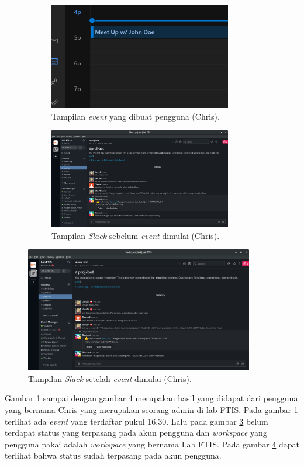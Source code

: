 \begin{figure}[h]
\begin{subfigure}{8.5cm}
  \centering
  \includegraphics[width=8cm]{./Gambar/PengujianChris/Outlook.png}
  \caption{Tampilan \textit{event} yang dibuat pengguna (Chris).}
  \label{fig:outlook_chris}
\end{subfigure}
\begin{subfigure}{8.5cm}
  \centering
  \includegraphics[width=8cm]{./Gambar/PengujianChris/Slack_Before.png}
  \caption{Tampilan \textit{Slack} sebelum \textit{event} dimulai (Chris).}
  \label{fig:slack_before_chris}
\end{subfigure}
\caption{}
\end{figure}

\begin{figure}[h]
  \includegraphics[width=10cm]{./Gambar/PengujianChris/Slack_After.png}
  \centering
  \caption{Tampilan \textit{Slack} setelah \textit{event} dimulai (Chris).}
  \label{fig:slack_after_chris}
\end{figure}

Gambar \ref{fig:outlook_chris} sampai dengan gambar \ref{fig:slack_after_chris} merupakan hasil yang didapat dari pengguna yang bernama Chris yang merupakan seorang admin di lab FTIS. Pada gambar \ref{fig:outlook_chris} terlihat ada \textit{event} yang terdaftar pukul 16.30. Lalu pada gambar \ref{fig:slack_before_chris} belum terdapat status yang terpasang pada akun pengguna dan \textit{workspace} yang pengguna pakai adalah \textit{workspace} yang bernama Lab FTIS. Pada gambar \ref{fig:slack_after_chris} dapat terlihat bahwa status sudah terpasang pada akun pengguna. 


